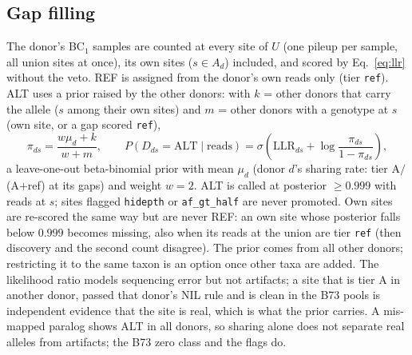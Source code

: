 \documentclass[11pt]{article}
\newcommand{\ALT}{\mathrm{ALT}}
\newcommand{\LLR}{\mathrm{LLR}}
\newcommand{\code}[1]{\texttt{#1}}
\begin{document}
\subsection{Gap filling}
The donor's BC$_1$ samples are counted at every site of $U$ (one pileup per sample, all union sites at once), its own sites ($s\in A_d$)
included, and scored by Eq.~\eqref{eq:llr} without the veto. REF is assigned from the donor's own reads only (tier \code{ref}). ALT uses a
prior raised by the other donors: with $k$ = other donors that carry the allele ($s$ among their own sites) and $m$ = other donors with a
genotype at $s$ (own site, or a gap scored \code{ref}),
\begin{equation}
\pi_{ds}=\frac{w\mu_d+k}{w+m},\qquad
P(D_{ds}=\ALT\mid\text{reads})=\sigma\!\left(\LLR_{ds}+\log\frac{\pi_{ds}}{1-\pi_{ds}}\right),
\label{eq:eb}
\end{equation}
a leave-one-out beta-binomial prior with mean $\mu_d$ (donor $d$'s sharing rate: tier A$/$(A$+$ref) at its gaps) and weight $w=2$.
ALT is called at posterior $\ge0.999$ with reads at $s$; sites flagged \code{hidepth} or \code{af\_gt\_half} are never promoted. Own
sites are re-scored the same way but are never REF: an own site whose posterior falls below $0.999$ becomes missing, also when its reads
at the union are tier \code{ref} (then discovery and the second count disagree). The prior comes from all other donors; restricting it to the same taxon is an option once
other taxa are added.
The likelihood ratio models sequencing error but not artifacts; a site that is tier A in another donor, passed that donor's NIL rule and is
clean in the B73 pools is independent evidence that the site is real, which is what the prior carries. A mis-mapped paralog shows ALT in all
donors, so sharing alone does not separate real alleles from artifacts; the B73 zero class and the flags do.
\end{document}
